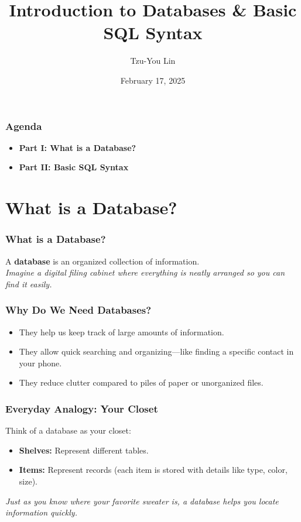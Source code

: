 \documentclass[10pt]{beamer}
\title{Introduction to Databases \& Basic SQL Syntax}
\author{Tzu-You Lin}
\date{February 17, 2025}
\begin{document}
\begin{frame}[fragile]
  \titlepage
\end{frame}

\begin{frame}[fragile]
  \frametitle{Agenda}
  \begin{itemize}
    \item \textbf{Part I: What is a Database?}
    \item \textbf{Part II: Basic SQL Syntax}
  \end{itemize}
\end{frame}


\section{What is a Database?}

\begin{frame}[fragile]
  \frametitle{What is a Database?}
  A \textbf{database} is an organized collection of information. \\
  \vspace{0.5em}
  \textit{Imagine a digital filing cabinet where everything is neatly arranged so you can find it easily.}
\end{frame}

\begin{frame}[fragile]
  \frametitle{Why Do We Need Databases?}
  \begin{itemize}
    \item They help us keep track of large amounts of information.
    \item They allow quick searching and organizing—like finding a specific contact in your phone.
    \item They reduce clutter compared to piles of paper or unorganized files.
  \end{itemize}
\end{frame}

\begin{frame}[fragile]
  \frametitle{Everyday Analogy: Your Closet}
  Think of a database as your closet:
  \begin{itemize}
    \item \textbf{Shelves:} Represent different tables.
    \item \textbf{Items:} Represent records (each item is stored with details like type, color, size).
  \end{itemize}
  \textit{Just as you know where your favorite sweater is, a database helps you locate information quickly.}
\end{frame}
\end{document}
